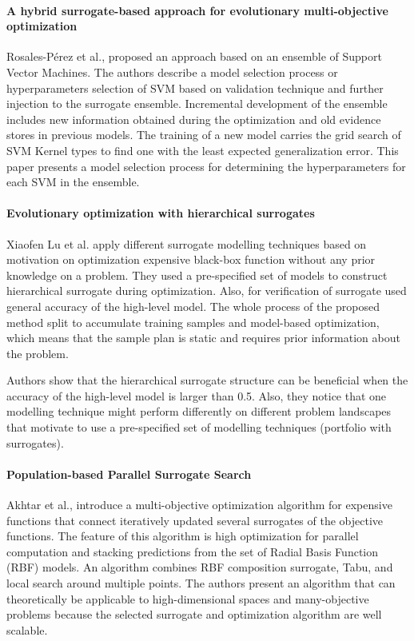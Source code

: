         \paragraph{A hybrid surrogate-based approach for evolutionary multi-objective optimization} Rosales-Pérez et al.,\cite{HybridSurrRCG} proposed an approach based on an ensemble of Support Vector Machines. The authors describe a model selection process or hyperparameters selection of SVM based on validation technique and further injection to the surrogate ensemble. Incremental development of the ensemble includes new information obtained during the optimization and old evidence stores in previous models. The training of a new model carries the grid search of SVM Kernel types to find one with the least expected generalization error. This paper presents a model selection process for determining the hyperparameters for each SVM in the ensemble.


        \paragraph{Evolutionary optimization with hierarchical surrogates} Xiaofen Lu et al. \cite{LuST19} apply different surrogate modelling techniques based on motivation on optimization expensive black-box function without any prior knowledge on a problem. They used a pre-specified set of models to construct hierarchical surrogate during optimization. Also, for verification of surrogate used general accuracy of the high-level model. The whole process of the proposed method split to accumulate training samples and model-based optimization, which means that the sample plan is static and requires prior information about the problem. 

        Authors show that the hierarchical surrogate structure can be beneficial when the accuracy of the high-level model is larger than 0.5. Also, they notice that one modelling technique might perform differently on different problem landscapes that motivate to use a pre-specified set of modelling techniques (portfolio with surrogates).
        
        \paragraph{Population-based Parallel Surrogate Search} Akhtar et al.,\cite{akhtar2019efficient} introduce a multi-objective optimization algorithm for expensive functions that connect iteratively updated several surrogates of the objective functions. The feature of this algorithm is high optimization for parallel computation and stacking predictions from the set of Radial Basis Function (RBF) models. An algorithm combines RBF composition surrogate, Tabu, and local search around multiple points. The authors present an algorithm that can theoretically be applicable to high-dimensional spaces and many-objective problems because the selected surrogate and optimization algorithm are well scalable.


